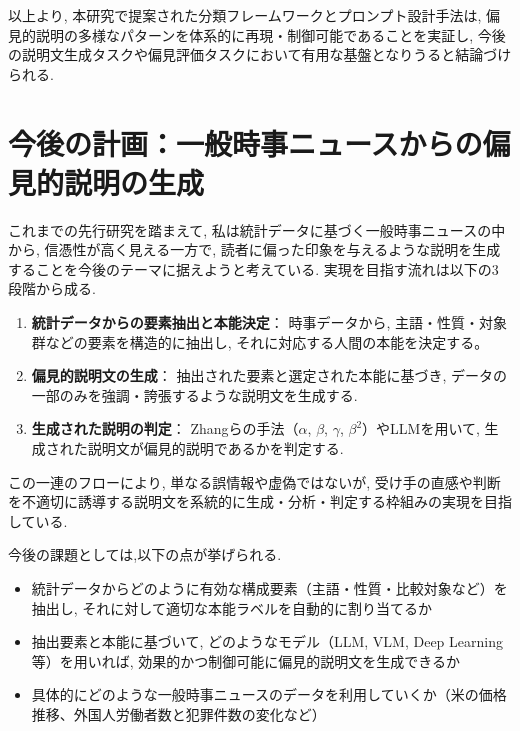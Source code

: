 \documentclass[dvipdfmx]{jsarticle}
\begin{document}
以上より, 本研究で提案された分類フレームワークとプロンプト設計手法は, 偏見的説明の多様なパターンを体系的に再現・制御可能であることを実証し, 今後の説明文生成タスクや偏見評価タスクにおいて有用な基盤となりうると結論づけられる.






\section{今後の計画：一般時事ニュースからの偏見的説明の生成}

これまでの先行研究を踏まえて, 私は統計データに基づく一般時事ニュースの中から, 信憑性が高く見える一方で, 読者に偏った印象を与えるような説明を生成することを今後のテーマに据えようと考えている.
\vspace{1em}
実現を目指す流れは以下の3段階から成る.

\begin{enumerate}
  \item \textbf{統計データからの要素抽出と本能決定}：
        時事データから, 主語・性質・対象群などの要素を構造的に抽出し, それに対応する人間の本能を決定する。

  \item \textbf{偏見的説明文の生成}：
        抽出された要素と選定された本能に基づき, データの一部のみを強調・誇張するような説明文を生成する.

  \item \textbf{生成された説明の判定}：
        Zhangらの手法（$\alpha$, $\beta$, $\gamma$, ${\beta}^2$）やLLMを用いて, 生成された説明文が偏見的説明であるかを判定する.
\end{enumerate}

この一連のフローにより, 単なる誤情報や虚偽ではないが, 受け手の直感や判断を不適切に誘導する説明文を系統的に生成・分析・判定する枠組みの実現を目指している.

\vspace{1em}
今後の課題としては,以下の点が挙げられる.

\begin{itemize}
  \item 統計データからどのように有効な構成要素（主語・性質・比較対象など）を抽出し, それに対して適切な本能ラベルを自動的に割り当てるか
  \item 抽出要素と本能に基づいて, どのようなモデル（LLM, VLM, Deep Learning等）を用いれば, 効果的かつ制御可能に偏見的説明文を生成できるか
  \item 具体的にどのような一般時事ニュースのデータを利用していくか（米の価格推移、外国人労働者数と犯罪件数の変化など）
\end{itemize}
\end{document}
